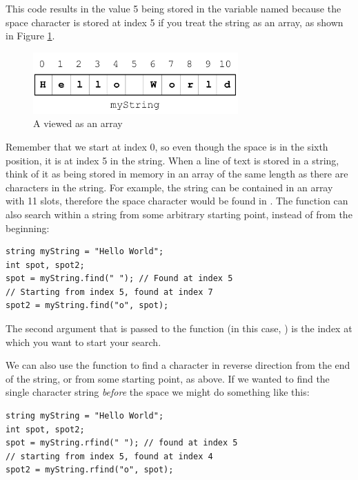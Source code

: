This code results in the value 5 being stored in the variable named  because the space character is stored at index 5 if you treat the string as an array, as shown in Figure \ref{fig:string-diagram}.

\begin{figure}[t]
  \centering
  \includegraphics[width=0.7\textwidth]{diagrams/string-diagram.pdf}
  \caption{A  viewed as an array} \label{fig:string-diagram} 
\end{figure}

Remember that we start at index 0, so even though the space is in the sixth position, it is at index 5 in the string.
When a line of text is stored in a string, think of it as being stored in memory in an array of the same length as there are characters in the string.
For example, the string  can be contained in an array with 11 slots, therefore the space character would be found in .
The  function can also search within a string from some arbitrary starting point, instead of from the beginning:

\noindent\begin{minipage}{\linewidth}\begin{lstlisting}
string myString = "Hello World";
int spot, spot2;
spot = myString.find(" "); // Found at index 5
// Starting from index 5, found at index 7
spot2 = myString.find("o", spot); 
\end{lstlisting}\end{minipage}

\noindent The second argument that is passed to the function (in this case, ) is the index at which you want to start your search.

We can also use the  function to find a character in reverse direction from the end of the string, or from some starting point, as above.
If we wanted to find the single character string  \emph{before} the space we might do something like this:

\noindent\begin{minipage}{\linewidth}\begin{lstlisting}
string myString = "Hello World";
int spot, spot2;
spot = myString.rfind(" "); // found at index 5
// starting from index 5, found at index 4
spot2 = myString.rfind("o", spot); 
\end{lstlisting}\end{minipage}

